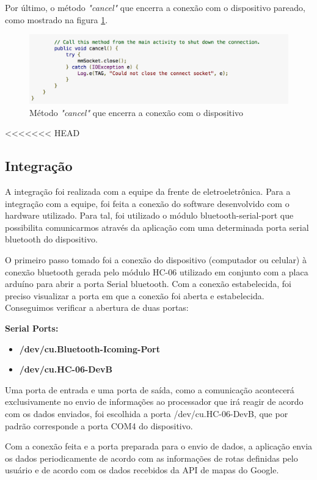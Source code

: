 Por último, o método \textit{"cancel"} que encerra a conexão com o dispositivo pareado, como mostrado na figura \ref{img:trecho5}.

\graphicspath{{figuras/}}
  \begin{figure}[!htb]
  \centering
  \includegraphics[scale=0.80]{cancel_method}
  \caption{Método \textit{"cancel"} que encerra a conexão com o dispositivo}
  \label{img:trecho5}
  \end{figure}  
  
<<<<<<< HEAD
	\subsection{Integração}
	A integração foi realizada com a equipe da frente de eletroeletrônica. Para a integração com a equipe, foi feita a conexão do software desenvolvido com o hardware utilizado. Para tal, foi utilizado o módulo bluetooth-serial-port que possibilita comunicarmos através da aplicação com uma determinada porta serial bluetooth do dispositivo.
	
	O primeiro passo tomado foi a conexão do dispositivo (computador ou celular) à conexão bluetooth gerada pelo módulo HC-06 utilizado em conjunto com a placa arduíno para abrir a porta Serial bluetooth. Com a conexão estabelecida, foi preciso visualizar a porta em que a conexão foi aberta e estabelecida. Conseguimos verificar a abertura de duas portas:
	
	\textbf{Serial Ports:}
	\begin{itemize}
		\item \textbf{/dev/cu.Bluetooth-Icoming-Port}
		\item \textbf{/dev/cu.HC-06-DevB}
	\end{itemize}
	
	Uma porta de entrada e uma porta de saída, como a comunicação acontecerá exclusivamente no envio de informações ao processador que irá reagir de acordo com os dados enviados, foi escolhida a porta /dev/cu.HC-06-DevB, que por padrão corresponde a porta COM4 do dispositivo.
	
	Com a conexão feita e a porta preparada para o envio de dados, a aplicação envia os dados periodicamente de acordo com as informações de rotas definidas pelo usuário e de acordo com os dados recebidos da API de mapas do Google.
	
